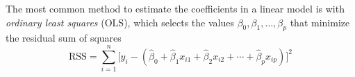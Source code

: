 \documentclass{article}
\newcommand{\argmin}[2]{\underset{#1}{\text{arg min}}\left\{#2\right\}}
\begin{document}
	The most common method to estimate the coefficients in a linear model is with \textit{ordinary least squares} (OLS), which selects the values $\beta_0, \beta_1, \dotsc, \beta_p$ that minimize the residual sum of squares
	\begin{equation}\label{eqn:RSS}
		\text{RSS} = \sum\limits_{i = 1}^n \Big[y_i - (\hat{\beta}_0 + \hat{\beta}_1 x_{i1} + \hat{\beta}_2 x_{i2} + \cdots + \hat{\beta}_p x_{ip})\Big]^2
	\end{equation}
	

	
\end{document}
